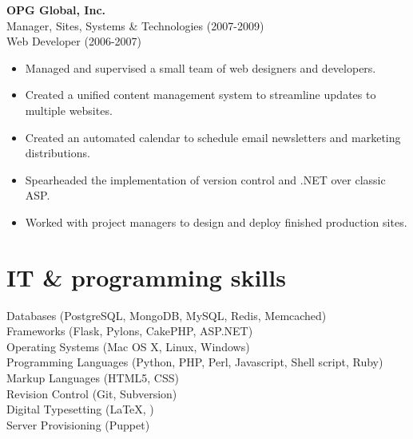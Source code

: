 \documentclass[10pt, a4paper]{article}
\newcommand{\years}[1]{\marginnote{\scriptsize #1}}
\begin{document}
\years{2006-2009}\textbf{OPG Global, Inc.}\\
Manager, Sites, Systems \& Technologies {\scriptsize (2007-2009)}\\
Web Developer {\scriptsize (2006-2007)}
\begin{itemize}
\item Managed and supervised a small team of web designers and developers.
\item Created a unified content management system to streamline updates to multiple websites.
\item Created an automated calendar to schedule email newsletters and marketing distributions.
\item Spearheaded the implementation of version control and .NET over classic ASP.
\item Worked with project managers to design and deploy finished production sites.
\end{itemize}

\section*{IT \& programming skills}
\noindent
Databases (PostgreSQL, MongoDB, MySQL, Redis, Memcached)\\
Frameworks (Flask, Pylons, CakePHP, ASP.NET)\\ %
Operating Systems (Mac OS X, Linux, Windows)\\
Programming Languages (Python, PHP, Perl, Javascript, Shell script, Ruby)\\ %
Markup Languages (HTML5, CSS)\\ %
Revision Control (Git, Subversion)\\
Digital Typesetting (\LaTeX, \XeTeX)\\
Server Provisioning (Puppet)\\
\end{document}
